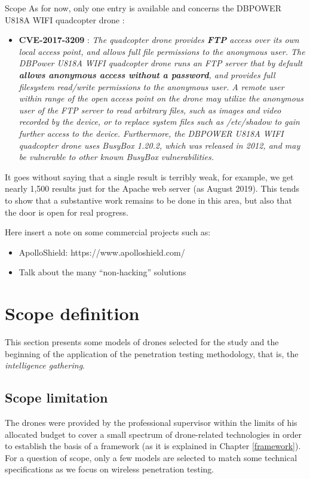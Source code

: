 \begin{chaptercover}{Scope}
As for now, only one entry is available and concerns the DBPOWER U818A WIFI quadcopter drone :
\begin{itemize}
  \item \textbf{CVE-2017-3209} : \textit{The quadcopter drone provides \textbf{FTP} access over its own local access point, and allows full file permissions to the anonymous user. The DBPower U818A WIFI quadcopter drone runs an FTP server that by default \textbf{allows anonymous access without a password}, and provides full filesystem read/write permissions to the anonymous user. A remote user within range of the open access point on the drone may utilize the anonymous user of the FTP server to read arbitrary files, such as images and video recorded by the device, or to replace system files such as /etc/shadow to gain further access to the device. Furthermore, the DBPOWER U818A WIFI quadcopter drone uses BusyBox 1.20.2, which was released in 2012, and may be vulnerable to other known BusyBox vulnerabilities.}
\end{itemize}

It goes without saying that a single result is terribly weak, for example, we get nearly 1,500 results just for the Apache web server (as August 2019). This tends to show that a substantive work remains to be done in this area, but also that the door is open for real progress.

{\color{red}
Here insert a note on some commercial projects such as:
\begin{itemize}
  \item ApolloShield:  https://www.apolloshield.com/
  \item Talk about the many “non-hacking” solutions
\end{itemize}}

\section{Scope definition}

This section presents some models of drones selected for the study and the beginning of the application of the penetration testing methodology, that is, the \textit{intelligence gathering}.

\subsection{Scope limitation}

The drones were provided by the professional supervisor within the limits of his allocated budget to cover a small spectrum of drone-related technologies in order to establish the basis of a framework (as it is explained in Chapter \ref{framework}). For a question of scope, only a few models are selected to match some technical specifications as we focus on wireless penetration testing.


\end{chaptercover}
